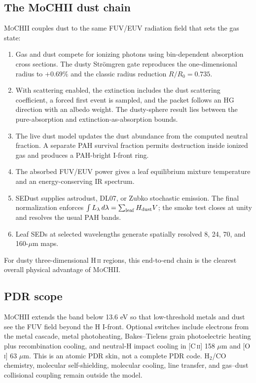 \documentclass[english,a4paper]{my_memo}
\newcommand{\MoCHII}{\textsc{MoCHII}}
\begin{document}
\subsection{The MoCHII dust chain}

\MoCHII{} couples dust to the same FUV/EUV radiation field that sets the
gas state:

\begin{enumerate}[leftmargin=2em]
\item Gas and dust compete for ionizing photons using bin-dependent
  absorption cross sections.  The dusty Str\"omgren gate reproduces the
  one-dimensional radius to $+0.69\%$ and the classic radius reduction
  $R/R_0=0.735$.
\item With scattering enabled, the extinction includes the dust scattering
  coefficient, a forced first event is sampled, and the packet follows an
  HG direction with an albedo weight.  The dusty-sphere result lies between
  the pure-absorption and extinction-as-absorption bounds.
\item The live dust model updates the dust abundance from the computed
  neutral fraction.  A separate PAH survival fraction permits destruction
  inside ionized gas and produces a PAH-bright I-front ring.
\item The absorbed FUV/EUV power gives a leaf equilibrium mixture
  temperature and an energy-conserving IR spectrum.
\item SEDust supplies astrodust, DL07, or Zubko stochastic emission.  The
  final normalization enforces
  $\int L_\lambda\,d\lambda=\sum_{\rm leaf}H_{\rm dust}V$; the smoke test
  closes at unity and resolves the usual PAH bands.
\item Leaf SEDs at selected wavelengths generate spatially resolved 8, 24,
  70, and 160-$\mu$m maps.
\end{enumerate}

For dusty three-dimensional H\,\textsc{ii} regions, this end-to-end chain
is the clearest overall physical advantage of \MoCHII{}.

\subsection{PDR scope}

\MoCHII{} extends the band below 13.6 eV so that low-threshold metals and
dust see the FUV field beyond the H I-front.  Optional switches include
electrons from the metal cascade, metal photoheating, Bakes--Tielens grain
photoelectric heating plus recombination cooling, and neutral-H impact
cooling in [C\,\textsc{ii}] 158 $\mu$m and [O\,\textsc{i}] 63 $\mu$m.
This is an atomic PDR skin, not a complete PDR code.  H$_2$/CO chemistry,
molecular self-shielding, molecular cooling, line transfer, and gas--dust
collisional coupling remain outside the model.
\end{document}
